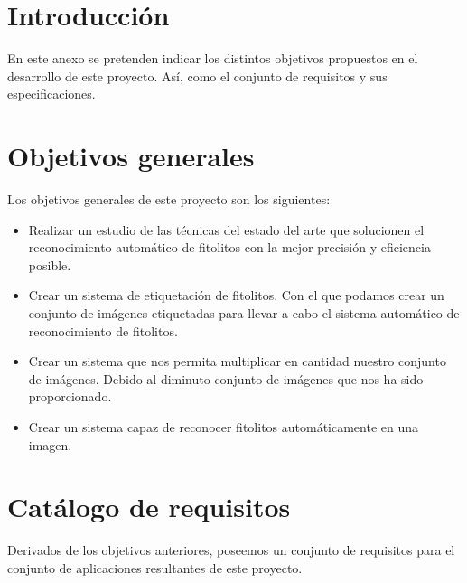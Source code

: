
\section{Introducción}
En este anexo se pretenden indicar los distintos objetivos propuestos en el desarrollo de este proyecto. Así, como el conjunto de requisitos y sus especificaciones.

\section{Objetivos generales}
Los objetivos generales de este proyecto son los siguientes:

\begin{itemize}
	\item Realizar un estudio de las técnicas del estado del arte que solucionen el
reconocimiento automático de fitolitos con la mejor precisión y eficiencia posible. 
	\item Crear un sistema de etiquetación de fitolitos. Con el que podamos crear un conjunto de imágenes etiquetadas para llevar a cabo el sistema automático de reconocimiento de fitolitos.
	\item Crear un sistema que nos permita multiplicar en cantidad nuestro conjunto de imágenes. Debido al diminuto conjunto de imágenes que nos ha sido proporcionado.
	\item Crear un sistema capaz de reconocer fitolitos automáticamente en una imagen.
\end{itemize}

\section{Catálogo de requisitos}
Derivados de los objetivos anteriores, poseemos un conjunto de requisitos para el conjunto de aplicaciones resultantes de este proyecto.

